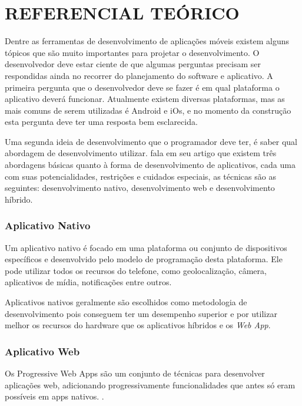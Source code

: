 
\chapter{REFERENCIAL TEÓRICO}
\label{chap:ref_teo}


Dentre as ferramentas de desenvolvimento de aplicações móveis existem alguns tópicos que são muito importantes para projetar o desenvolvimento. O desenvolvedor deve estar ciente de que algumas perguntas precisam ser respondidas ainda no recorrer do planejamento do software e aplicativo. A primeira pergunta que o desenvolvedor deve se fazer é em qual plataforma o aplicativo deverá funcionar. Atualmente existem diversas plataformas, mas as mais comuns de serem utilizadas é Android e iOs, e no momento da construção esta pergunta deve ter uma resposta bem esclarecida.

Uma segunda ideia de desenvolvimento que o programador deve ter, é saber qual abordagem de desenvolvimento utilizar.
\cite{apps} fala em seu artigo que existem três abordagens básicas quanto à forma de desenvolvimento de aplicativos, cada uma com suas potencialidades, restrições e cuidados especiais, as técnicas são as seguintes: desenvolvimento nativo, desenvolvimento web e desenvolvimento híbrido.

\subsection{Aplicativo Nativo}
Um aplicativo nativo é focado em uma plataforma ou conjunto de dispositivos específicos e desenvolvido pelo modelo de programação desta plataforma. Ele pode utilizar todos os recursos do telefone, como geolocalização, câmera, aplicativos de mídia, notificações entre outros. 

Aplicativos nativos geralmente são escolhidos como metodologia de desenvolvimento pois conseguem ter um desempenho superior e por utilizar melhor os recursos do hardware que os aplicativos híbridos e os \textit{Web App}.


\subsection{Aplicativo Web}
Os Progressive Web Apps são um conjunto de técnicas para desenvolver aplicações web, adicionando progressivamente funcionalidades que antes só eram possíveis em apps nativos. . 

